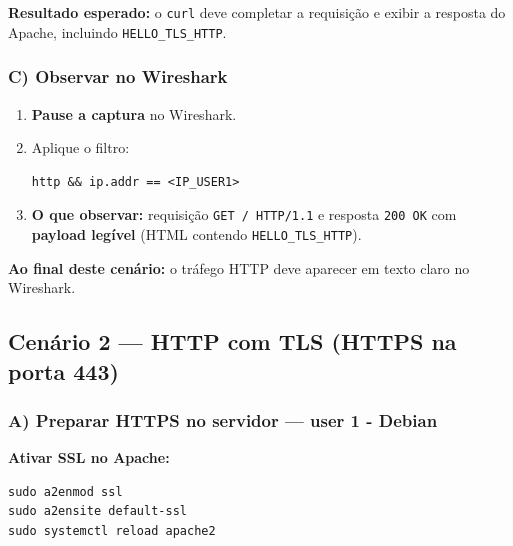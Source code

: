 \begin{notebox}
\textbf{Resultado esperado:} o \texttt{curl} deve completar a requisição e exibir a resposta do Apache, incluindo \texttt{HELLO\_TLS\_HTTP}.
\end{notebox}


\subsubsection*{C) Observar no Wireshark}

\begin{enumerate}
\item \textbf{Pause a captura} no Wireshark.


\item Aplique o filtro:
\begin{lstlisting}
http && ip.addr == <IP_USER1>
\end{lstlisting}

\item \textbf{O que observar:} requisição \texttt{GET / HTTP/1.1} e resposta \texttt{200 OK} com \textbf{payload legível} (HTML contendo \texttt{HELLO\_TLS\_HTTP}).

\end{enumerate}

\begin{notebox}
\textbf{Ao final deste cenário:} o tráfego HTTP deve aparecer em texto claro no Wireshark.
\end{notebox}

\subsection{Cenário 2 --- HTTP com TLS (HTTPS na porta 443)}

\subsubsection*{A) Preparar HTTPS no servidor --- user 1 - Debian}

\textbf{Ativar SSL no Apache:}
\begin{lstlisting}
sudo a2enmod ssl
sudo a2ensite default-ssl
sudo systemctl reload apache2
\end{lstlisting}

